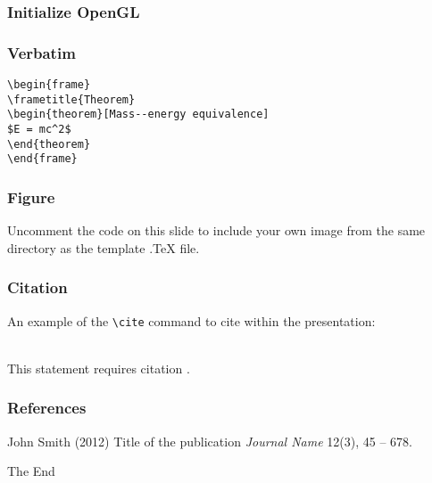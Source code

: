 \documentclass{beamer}
\begin{document}

\begin{frame}
  \frametitle{Initialize OpenGL}
\end{frame}


\begin{frame}[fragile] %
  \frametitle{Verbatim}
\begin{example}
\begin{verbatim}
\begin{frame}
\frametitle{Theorem}
\begin{theorem}[Mass--energy equivalence]
$E = mc^2$
\end{theorem}
\end{frame}\end{verbatim}
\end{example}
\end{frame}


\begin{frame}
\frametitle{Figure}
Uncomment the code on this slide to include your own image from the same directory as the template .TeX file.
\end{frame}


\begin{frame}[fragile] %
\frametitle{Citation}
An example of the \verb|\cite| command to cite within the presentation:\\~

This statement requires citation \cite{p1}.
\end{frame}


\begin{frame}
\frametitle{References}
\footnotesize{
\begin{thebibliography}{99} %
 John Smith (2012)
\newblock Title of the publication
\newblock \emph{Journal Name} 12(3), 45 -- 678.
\end{thebibliography}
}
\end{frame}


\begin{frame}
\Huge{\centerline{The End}}
\end{frame}

\end{document}
